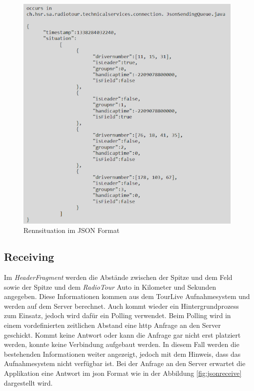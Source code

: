 \begin{figure}[H]
\caption{Rennsituation im JSON Format}
\label{fig:jsonsend}
\centering
\includegraphics[scale=1]{05bericht/images/json.png}
\end{figure}


\subsection{Receiving}
Im \textit{HeaderFragment} werden die Abstände zwischen der Spitze und dem Feld sowie der Spitze und dem \textit{RadioTour} Auto in Kilometer und Sekunden angegeben. Diese Informationen kommen aus dem TourLive Aufnahmesystem und werden auf dem Server berechnet. Auch kommt wieder ein Hintergrundprozess zum Einsatz, jedoch wird dafür ein Polling verwendet. Beim Polling wird in einem vordefinierten zeitlichen Abstand eine \gls{http} Anfrage an den Server geschickt. Kommt keine Antwort oder kann die Anfrage gar nicht erst platziert werden, konnte keine Verbindung aufgebaut werden. In diesem Fall werden die bestehenden Informationen weiter angezeigt, jedoch mit dem Hinweis, dass das Aufnahmesystem nicht verfügbar ist. Bei der Anfrage an den Server erwartet die Applikation eine Antwort im \gls{json} Format wie in der Abbildung \ref{fig:jsonreceive} dargestellt wird.

